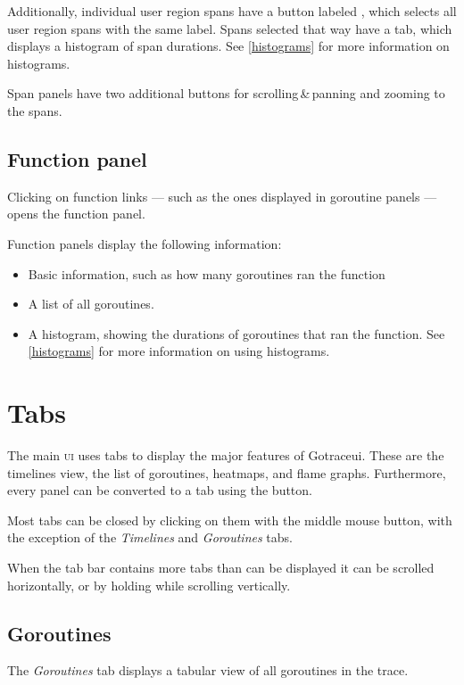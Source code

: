 \documentclass[10pt,letterpaper,oneside,openany,english]{memoir}
\begin{document}
Additionally, individual user region spans have a button labeled ,
which selects all user region spans with the same label.
Spans selected that way have a  tab, which displays a histogram of span durations.
See \cref{histograms} for more information on histograms.

Span panels have two additional buttons for scrolling\,\&\,panning and zooming to the spans.

\subsection{Function panel}\label{function-panel}

Clicking on function links --- such as the ones displayed in goroutine panels --- opens the function panel.

Function panels display the following information:

\begin{itemize}
\item Basic information, such as how many goroutines ran the function
\item A list of all goroutines.
\item A histogram, showing the durations of goroutines that ran the function.
  See \cref{histograms} for more information on using histograms.
\end{itemize}

\section{Tabs}\label{tabs}

The main \textsc{ui} uses tabs to display the major features of Gotraceui.
These are the timelines view, the list of goroutines, heatmaps, and flame graphs.
Furthermore, every panel can be converted to a tab using the  button.

Most tabs can be closed by clicking on them with the middle mouse button,
with the exception of the \emph{Timelines} and \emph{Goroutines} tabs.

When the tab bar contains more tabs than can be displayed it can be scrolled horizontally,
or by holding \keys{\shift} while scrolling vertically.

\subsection{Goroutines}

The \emph{Goroutines} tab displays a tabular view of all goroutines in the trace.
\end{document}
